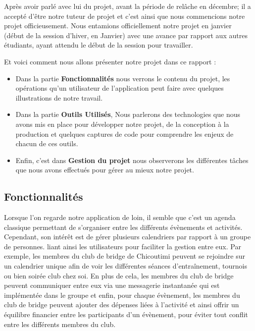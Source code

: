 Après avoir parlé avec lui du projet, avant la période de relâche en décembre; il a accepté d'être notre tuteur de projet et c'est ainsi que nous commencions notre projet officieusement. Nous entamions officiellement notre projet en janvier (début de la session d'hiver, en Janvier) avec une avance par rapport aux autres étudiants, ayant attendu le début de la session pour travailler. 

Et voici comment nous allons présenter notre projet dans ce rapport : 

\begin{itemize}
    \item Dans la partie \textbf{Fonctionnalités} nous verrons le contenu du projet, les opérations qu'un utilisateur de l'application peut faire avec quelques illustrations de notre travail.
    \item Dans la partie \textbf{Outils Utilisés}, Nous parlerons des technologies que nous avons mis en place pour développer notre projet, de la conception à la production et quelques captures de code pour comprendre les enjeux de chacun de ces outils.
    \item Enfin, c'est dans \textbf{Gestion du projet} nous observerons les différentes tâches que nous avons effectués pour gérer au mieux notre projet.
\end{itemize}

\subsection{Fonctionnalités}

Lorsque l'on regarde notre application de loin, il semble que c'est un agenda classique permettant de s'organiser entre les différents évènements et activités. Cependant, son intérêt est de gérer plusieurs calendriers par rapport à un groupe de personnes. liant ainsi les utilisateurs pour faciliter la gestion entre eux. Par exemple, les membres du club de bridge de Chicoutimi peuvent se rejoindre sur un calendrier unique afin de voir les différentes séances d'entraînement, tournois ou bien soirée club chez soi. En plus de cela, les membres du club de bridge peuvent communiquer entre eux via une messagerie instantanée qui est implémentée dans le groupe et enfin, pour chaque évènement, les membres du club de bridge peuvent ajouter des dépenses liées à l'activité et ainsi offrir un équilibre financier entre les participants d'un évènement, pour éviter tout conflit entre les différents membres du club.
\\


